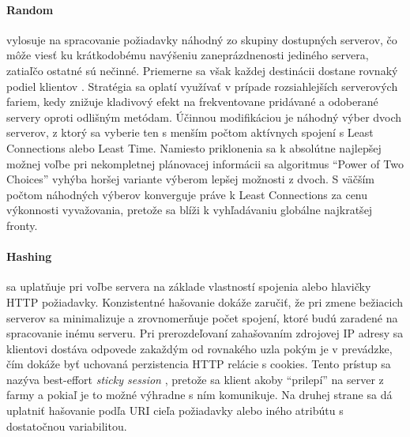 \documentclass[12pt, a4paper]{article}
\begin{document}
\paragraph{Random} vylosuje na spracovanie požiadavky náhodný zo skupiny dostupných serverov, 
čo môže viesť ku krátkodobému navýšeniu zaneprázdnenosti jediného servera, zatiaľčo
ostatné sú nečinné. Priemerne sa však každej destinácii dostane rovnaký podiel klientov 
\cite{load-balance-in-distributed-system}. Stratégia sa oplatí využívať v prípade rozsiahlejších 
serverových fariem, kedy znižuje kladivový efekt na frekventovane pridávané a odoberané servery oproti
odlišným metódam. Účinnou modifikáciou je náhodný výber dvoch serverov, z ktorý sa vyberie ten
s menším počtom aktívnych spojení s Least Connections alebo Least Time. Namiesto priklonenia sa
k absolútne najlepšej možnej voľbe pri nekompletnej plánovacej informácii sa algoritmus
\enquote{Power of Two Choices} vyhýba horšej variante výberom lepšej možnosti z dvoch. S väčším počtom
náhodných výberov konverguje práve k Least Connections \cite{power-two-choices} za cenu výkonnosti 
vyvažovania, pretože sa blíži k vyhľadávaniu globálne najkratšej fronty.

\paragraph{Hashing} sa uplatňuje pri voľbe servera na základe vlastností spojenia alebo hlavičky HTTP 
požiadavky. Konzistentné hašovanie dokáže zaručiť, že pri zmene bežiacich serverov sa minimalizuje a 
zrovnomerňuje počet spojení, ktoré budú zaradené na spracovanie inému serveru. Pri prerozdeľovaní 
zahašovaním zdrojovej IP adresy sa klientovi dostáva odpovede zakaždým od rovnakého uzla pokým je v 
prevádzke, čím dokáže byť uchovaná perzistencia HTTP relácie s cookies. Tento prístup sa nazýva
best-effort \emph{sticky session} \cite{haproxy-docs}, pretože sa klient akoby \enquote{prilepí} na server
z farmy a pokiaľ je to možné výhradne s ním komunikuje. Na druhej strane sa dá uplatniť hašovanie podľa 
URI cieľa požiadavky alebo iného atribútu s dostatočnou variabilitou.
\end{document}
